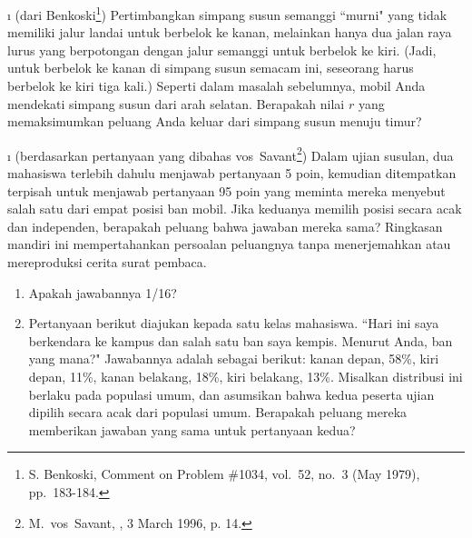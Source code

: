 \begin{LJSItem}
\i\label{exer 1.2.29}
(dari Benkoski\footnote{S. Benkoski, Comment on Problem \#1034, 
vol.~52, no.\ 3 (May 1979), pp.~183-184.}) Pertimbangkan simpang susun
semanggi ``murni" yang tidak memiliki jalur landai untuk berbelok ke kanan, melainkan hanya dua
jalan raya lurus yang berpotongan dengan jalur semanggi untuk berbelok ke kiri.  (Jadi, untuk berbelok ke kanan di
simpang susun semacam ini, seseorang harus berbelok ke kiri tiga kali.)  Seperti dalam masalah sebelumnya, mobil Anda
mendekati simpang susun dari arah selatan.  Berapakah nilai $r$ yang memaksimumkan
peluang Anda keluar dari simpang susun menuju timur?

\i\label{exer 1.2.30}
(berdasarkan pertanyaan yang dibahas vos~Savant\footnote{M.~vos~Savant,
, 3 March 1996, p. 14.}) Dalam ujian
susulan, dua mahasiswa terlebih dahulu menjawab pertanyaan 5 poin, kemudian ditempatkan
terpisah untuk menjawab pertanyaan 95 poin yang meminta mereka menyebut salah satu dari empat
posisi ban mobil. Jika keduanya memilih posisi secara acak dan independen, berapakah peluang
bahwa jawaban mereka sama? Ringkasan mandiri ini mempertahankan persoalan peluangnya tanpa
menerjemahkan atau mereproduksi cerita surat pembaca.


\begin{enumerate}
\item
Apakah jawabannya 1/16?
\item
Pertanyaan berikut diajukan kepada satu kelas mahasiswa.  ``Hari ini saya berkendara ke
kampus dan salah satu ban saya kempis.  Menurut Anda, ban yang mana?"
Jawabannya adalah sebagai berikut: kanan depan, 58\%, kiri depan, 11\%, kanan belakang, 
18\%, kiri belakang, 13\%.  Misalkan distribusi ini berlaku pada populasi umum,
dan asumsikan bahwa kedua peserta ujian dipilih secara acak dari populasi umum.  Berapakah
peluang mereka memberikan jawaban yang sama untuk pertanyaan kedua?
\end{enumerate}


\end{LJSItem}
